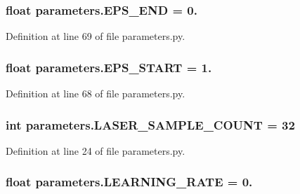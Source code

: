 \subsubsection[{\texorpdfstring{E\+P\+S\+\_\+\+E\+ND}{EPS_END}}]{\setlength{\rightskip}{0pt plus 5cm}float parameters.\+E\+P\+S\+\_\+\+E\+ND = 0.}\hypertarget{namespaceparameters_a3765f189d3af4815766ded3bffcba1e2}{}\label{namespaceparameters_a3765f189d3af4815766ded3bffcba1e2}


Definition at line 69 of file parameters.\+py.

\subsubsection[{\texorpdfstring{E\+P\+S\+\_\+\+S\+T\+A\+RT}{EPS_START}}]{\setlength{\rightskip}{0pt plus 5cm}float parameters.\+E\+P\+S\+\_\+\+S\+T\+A\+RT = 1.}\hypertarget{namespaceparameters_a371d0de003e9046dcc72450b7512ce14}{}\label{namespaceparameters_a371d0de003e9046dcc72450b7512ce14}


Definition at line 68 of file parameters.\+py.

\subsubsection[{\texorpdfstring{L\+A\+S\+E\+R\+\_\+\+S\+A\+M\+P\+L\+E\+\_\+\+C\+O\+U\+NT}{LASER_SAMPLE_COUNT}}]{\setlength{\rightskip}{0pt plus 5cm}int parameters.\+L\+A\+S\+E\+R\+\_\+\+S\+A\+M\+P\+L\+E\+\_\+\+C\+O\+U\+NT = 32}\hypertarget{namespaceparameters_a24735dce78cf9899cf1ec4bda2ea4eac}{}\label{namespaceparameters_a24735dce78cf9899cf1ec4bda2ea4eac}


Definition at line 24 of file parameters.\+py.

\subsubsection[{\texorpdfstring{L\+E\+A\+R\+N\+I\+N\+G\+\_\+\+R\+A\+TE}{LEARNING_RATE}}]{\setlength{\rightskip}{0pt plus 5cm}float parameters.\+L\+E\+A\+R\+N\+I\+N\+G\+\_\+\+R\+A\+TE = 0.}\hypertarget{namespaceparameters_afb996d542e8c3d3e8bbdfe4a711694dd}{}\label{namespaceparameters_afb996d542e8c3d3e8bbdfe4a711694dd}


